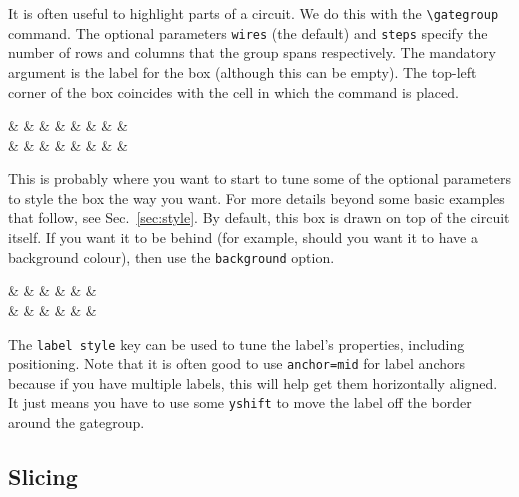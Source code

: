 \documentclass[aps,pra,10pt,nofootinbib]{revtex4-2}
\begin{document}
It is often useful to highlight parts of a circuit. We do this with the \verb!\gategroup! command. The optional parameters \verb!wires! (the default) and \verb!steps! specify the number of rows and columns that the group spans respectively. The mandatory argument is the label for the box (although this can be empty). The top-left corner of the box coincides with the cell in which the command is placed.
\begin{Code}
\begin{quantikz}
&  &  &  &  &  &  & & \\
& & \targ{} &  & \targ{} &  & \targ{} &  &
\end{quantikz}
\end{Code}
This is probably where you want to start to tune some of the optional parameters to style the box the way you want. For more details beyond some basic examples that follow, see Sec.\ \ref{sec:style}. By default, this box is drawn on top of the circuit itself. If you want it to be behind (for example, should you want it to have a background colour), then use the \verb!background! option.
\begin{Code}
\begin{quantikz}
&  &  & \targ{} &  & & \\
& & \targ{} &  & \targ{} &  &
\end{quantikz}
\end{Code}
The \verb!label style! key can be used to tune the label's properties, including positioning. Note that it is often good to use \verb!anchor=mid! for label anchors because if you have multiple labels, this will help get them horizontally aligned. It just means you have to use some \verb!yshift! to move the label off the border around the gategroup.

\subsection{Slicing}
\end{document}
